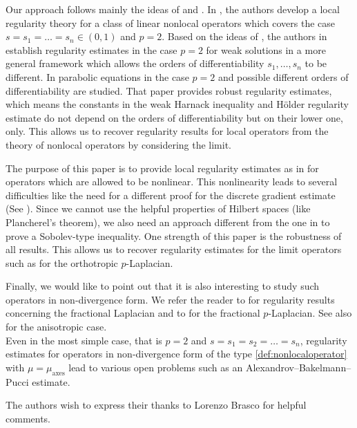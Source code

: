 \documentclass[11pt]{amsart}
\theoremstyle{plain}
\theoremstyle{definition}
\numberwithin{equation}{section}
\newcommand{\ma}{\mu_{\mathrm{axes}}}
\begin{document}
Our approach follows mainly the ideas of \cite{DK20,CK20} and \cite{CKW19}.
In \cite{DK20}, the authors develop a local regularity theory for a class of linear nonlocal operators which covers the case $s=s_1=\dots=s_n\in(0,1)$ and $p=2$. Based on the ideas of \cite{DK20}, the authors in \cite{CK20} establish regularity estimates in the case $p=2$ for weak solutions in a more general framework which allows the orders of differentiability $s_1,\dots,s_n$ to be different. In \cite{CKW19} parabolic equations in the case $p=2$ and  possible different orders of differentiability are studied. That paper provides robust regularity estimates, which means the constants in the weak Harnack inequality and H\"older regularity estimate do not depend on the orders of differentiability but on their lower one, only. This allows us to recover regularity results for local operators from the theory of nonlocal operators by considering the limit.

The purpose of this paper is to provide local regularity estimates as in \cite{CK20} for operators which are allowed to be nonlinear. This nonlinearity leads to several difficulties like the need for a different proof for the discrete gradient estimate (See ). Since we cannot use the helpful properties of Hilbert spaces (like Plancherel's theorem), we also need an approach different from the one in \cite{CK20} to prove a Sobolev-type inequality.
One strength of this paper is the robustness of all results. This allows us to recover regularity estimates for the limit operators such as for the orthotropic $p$-Laplacian. 

Finally, we would like to point out that it is also interesting to study such
operators in non-divergence form. We refer the reader to \cite{SilvInd} for regularity results concerning the fractional Laplacian and to \cite{Lind16} for the fractional $p$-Laplacian. See also \cite{LeitSan20} for the anisotropic case. \\
Even in the most simple case, that is $p=2$ and $s=s_1=s_2=\dots=s_n$, regularity estimates for operators in non-divergence form of the type \eqref{def:nonlocaloperator} with $\mu=\ma$ lead to various open problems such as an Alexandrov--Bakelmann--Pucci estimate.

The authors wish to express their thanks to Lorenzo Brasco for helpful comments.
\end{document}
